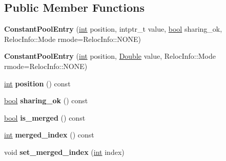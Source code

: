 \subsection*{Public Member Functions}
\begin{DoxyCompactItemize}
\item 
\mbox{\label{classv8_1_1internal_1_1ConstantPoolEntry_a7e126bd1a28f792b50a45a69c74feb15}} 
{\bfseries Constant\+Pool\+Entry} (\mbox{\hyperlink{classint}{int}} position, intptr\+\_\+t value, \mbox{\hyperlink{classbool}{bool}} sharing\+\_\+ok, Reloc\+Info\+::\+Mode rmode=Reloc\+Info\+::\+N\+O\+NE)
\item 
\mbox{\label{classv8_1_1internal_1_1ConstantPoolEntry_a54aa8eb405f32559f40ffa974b9c3c20}} 
{\bfseries Constant\+Pool\+Entry} (\mbox{\hyperlink{classint}{int}} position, \mbox{\hyperlink{classv8_1_1internal_1_1Double}{Double}} value, Reloc\+Info\+::\+Mode rmode=Reloc\+Info\+::\+N\+O\+NE)
\item 
\mbox{\label{classv8_1_1internal_1_1ConstantPoolEntry_a9a8ff3456fd8c3f97729d0b4a6d11de9}} 
\mbox{\hyperlink{classint}{int}} {\bfseries position} () const
\item 
\mbox{\label{classv8_1_1internal_1_1ConstantPoolEntry_a83d2472a93bce7206cb9cf3b0f33414f}} 
\mbox{\hyperlink{classbool}{bool}} {\bfseries sharing\+\_\+ok} () const
\item 
\mbox{\label{classv8_1_1internal_1_1ConstantPoolEntry_ac9eecd76954e644d9f682ce17a72ae97}} 
\mbox{\hyperlink{classbool}{bool}} {\bfseries is\+\_\+merged} () const
\item 
\mbox{\label{classv8_1_1internal_1_1ConstantPoolEntry_a72d3deb110bcdea1945cfdac6ace18fe}} 
\mbox{\hyperlink{classint}{int}} {\bfseries merged\+\_\+index} () const
\item 
\mbox{\label{classv8_1_1internal_1_1ConstantPoolEntry_a5990c4b32551a11641b0bcc894fe8fd4}} 
void {\bfseries set\+\_\+merged\+\_\+index} (\mbox{\hyperlink{classint}{int}} index)

\end{DoxyCompactItemize}
